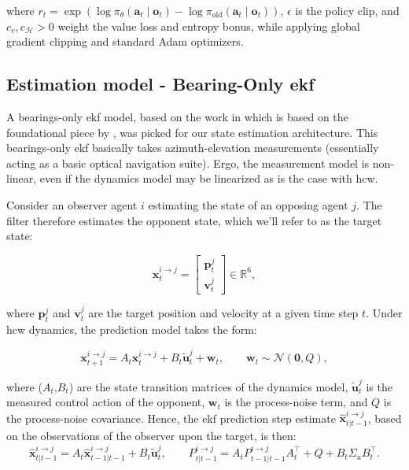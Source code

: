 where \(r_t=\exp\!\left(\log\pi_\theta(\mathbf{a}_t \mid \mathbf{o}_t)-\log\pi_{\mathrm{old}}(\mathbf{a}_t \mid \mathbf{o}_t)\right)\),
\(\epsilon\) is the policy clip, and \(c_v,c_{\mathcal{H}}>0\) weight the value loss and entropy bonus, while applying global gradient clipping and standard Adam optimizers.


\subsection{Estimation model - Bearing-Only \acs{ekf}}
\label{sec:estimation-model-ekf}

A bearings-only \acs{ekf} model, based on the work in \cite{aidala1979kalman} which is based on the foundational piece by \cite{kalman1960new}, was picked for our state estimation architecture. This bearings-only \acs{ekf} basically takes azimuth-elevation measurements (essentially acting as a basic optical navigation suite). Ergo, the measurement model is non-linear, even if the dynamics model may be linearized as is the case with \acs{hcw}. 

Consider an observer agent $i$ estimating the state of an opposing agent $j$. The filter therefore estimates the opponent state, which we'll refer to as the target state:

\[
\mathbf{x}^{i\to j}_t =
\begin{bmatrix}
\mathbf{p}^{j}_t\\[2pt]
\mathbf{v}^{j}_t
\end{bmatrix}
\in \mathbb{R}^6,
\]

where $\mathbf{p}^{j}_t$ and $\mathbf{v}^{j}_t$ are the target position and velocity at a given time step $t$. Under \acs{hcw} dynamics, the prediction model takes the form:

\[
\mathbf{x}^{i\to j}_{t+1} = A_t\mathbf{x}^{i\to j}_{t} + B_t\tilde{\mathbf{u}}^{j}_{t} + \mathbf{w}_t,
\qquad
\mathbf{w}_t \sim \mathcal{N}(\mathbf{0},Q),
\]

where ($A_t$,$B_t$) are the state transition matrices of the dynamics model, $\tilde{\mathbf{u}}^{j}_{t}$ is the measured control action of the opponent, $\mathbf{w}_t$ is the process-noise term, and $Q$ is the process-noise covariance. Hence, the \acs{ekf} prediction step estimate $\hat{\mathbf{x}}^{i\to j}_{t|t-1}$, based on the observations of the observer upon the target, is then:
\[
\hat{\mathbf{x}}^{i\to j}_{t|t-1} = A_t\hat{\mathbf{x}}^{i\to j}_{t-1|t-1} + B_t\tilde{\mathbf{u}}^{j}_{t},
\qquad
P^{i\to j}_{t|t-1} = A_t P^{i\to j}_{t-1|t-1}A_t^\top + Q + B_t\Sigma_u B_t^\top.
\]

